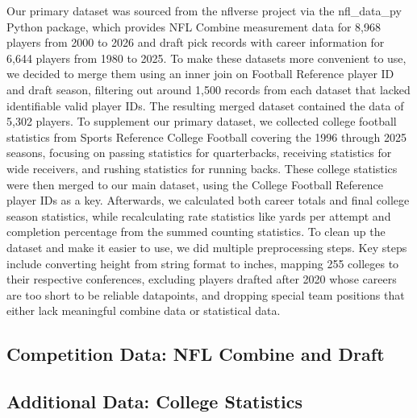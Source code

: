 \documentclass[11pt]{article}
\begin{document}
Our primary dataset was sourced from the nflverse project via the nfl\_data\_py Python package, which provides NFL Combine measurement data for 8,968 players from 2000 to 2026 and draft pick records with career information for 6,644 players from 1980 to 2025. To make these datasets more convenient to use, we decided to merge them using an inner join on Football Reference player ID and draft season, filtering out around 1,500 records from each dataset that lacked identifiable valid player IDs. The resulting merged dataset contained the data of 5,302 players. To supplement our primary dataset, we collected college football statistics from Sports Reference College Football covering the 1996 through 2025 seasons, focusing on passing statistics for quarterbacks, receiving statistics for wide receivers, and rushing statistics for running backs. These college statistics were then merged to our main dataset, using the College Football Reference player IDs as a key. Afterwards, we calculated both career totals and final college season statistics, while recalculating rate statistics like yards per attempt and completion percentage from the summed counting statistics. To clean up the dataset and make it easier to use, we did multiple preprocessing steps. Key steps include converting height from string format to inches, mapping 255 colleges to their respective conferences, excluding players drafted after 2020 whose careers are too short to be reliable datapoints, and dropping special team positions that either lack meaningful combine data or statistical data.

\subsection{Competition Data: NFL Combine and Draft}


\subsection{Additional Data: College Statistics}

\end{document}
